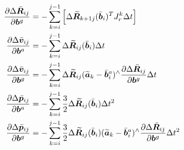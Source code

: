 \begin{equation}
\label{equ5.26}
\begin{aligned}
{\partial \Delta \bar{\boldsymbol{R}}_{ij} \over \partial \boldsymbol{b}^g } &= - \sum\limits_{k=i}^{j-1} \left[  \Delta \widetilde{\boldsymbol{R}}_{k+1j}(\bar{\boldsymbol{b}}_i)^T J_r^k \Delta t \right] 
\\ 
{\partial \Delta \bar{\boldsymbol{v}}_{ij} \over \partial \boldsymbol{b}^a } &= -\sum\limits_{k=i}^{j-1} \Delta \widetilde{\boldsymbol{R}}_{ij}(\bar{\boldsymbol{b}}_i) \Delta t
\\
{\partial \Delta \bar{\boldsymbol{v}}_{ij} \over \partial \boldsymbol{b}^g } &= -\sum\limits_{k=i}^{j-1} \Delta \widetilde{\boldsymbol{R}}_{ij}(\widetilde{\boldsymbol{a}}_k - \bar{\boldsymbol{b}}_i^a)^{\wedge} {\partial \Delta \bar{\boldsymbol{R}}_{ij} \over \partial \boldsymbol{b}^g } \Delta t
\\
{\partial \Delta \bar{\boldsymbol{p}}_{ij} \over \partial \boldsymbol{b}^a } &= -\sum\limits_{k=i}^{j-1} {3 \over 2} \Delta \widetilde{\boldsymbol{R}}_{ij}(\bar{\boldsymbol{b}}_i) \Delta t^2 
\\
{\partial \Delta \bar{\boldsymbol{p}}_{ij} \over \partial \boldsymbol{b}^g } &= -\sum\limits_{k=i}^{j-1} {3 \over 2} \Delta \widetilde{\boldsymbol{R}}_{ij}(\bar{\boldsymbol{b}}_i) (\widetilde{\boldsymbol{a}}_k - \bar{\boldsymbol{b}}_i^a)^{\wedge} {\partial \Delta \bar{\boldsymbol{R}}_{ij} \over \partial \boldsymbol{b}^g } \Delta t^2
\end{aligned}
\end{equation}

